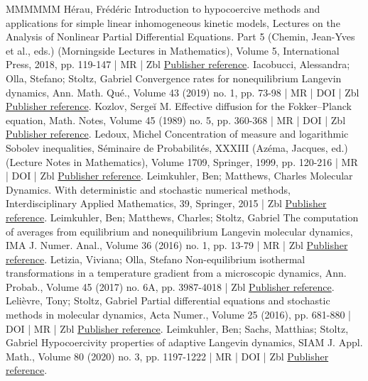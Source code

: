 \begin{thebibliography}{MMMMMM}
 Hérau, Frédéric Introduction to hypocoercive methods and applications for simple linear inhomogeneous kinetic models, Lectures on the Analysis of Nonlinear Partial Differential Equations. Part 5 (Chemin, Jean-Yves et al., eds.) (Morningside Lectures in Mathematics), Volume 5, International Press, 2018, pp. 119-147 | MR | Zbl \href{https://ahl.centre-mersenne.org/item/AHL_2022__5__523_0/#Herau16}{Publisher reference}.
 Iacobucci, Alessandra; Olla, Stefano; Stoltz, Gabriel Convergence rates for nonequilibrium Langevin dynamics, Ann. Math. Qué., Volume 43 (2019) no. 1, pp. 73-98 | MR | DOI | Zbl \href{https://ahl.centre-mersenne.org/item/AHL_2022__5__523_0/#IOS19}{Publisher reference}.
 Kozlov, Sergeĭ M. Effective diffusion for the Fokker–Planck equation, Math. Notes, Volume 45 (1989) no. 5, pp. 360-368 | MR | DOI | Zbl \href{https://ahl.centre-mersenne.org/item/AHL_2022__5__523_0/#Kozlov89}{Publisher reference}.
 Ledoux, Michel Concentration of measure and logarithmic Sobolev inequalities, Séminaire de Probabilités, XXXIII (Azéma, Jacques, ed.) (Lecture Notes in Mathematics), Volume 1709, Springer, 1999, pp. 120-216 | MR | DOI | Zbl \href{https://ahl.centre-mersenne.org/item/AHL_2022__5__523_0/#Led99}{Publisher reference}.
 Leimkuhler, Ben; Matthews, Charles Molecular Dynamics. With deterministic and stochastic numerical methods, Interdisciplinary Applied Mathematics, 39, Springer, 2015 | Zbl \href{https://ahl.centre-mersenne.org/item/AHL_2022__5__523_0/#LM15}{Publisher reference}.
 Leimkuhler, Ben; Matthews, Charles; Stoltz, Gabriel The computation of averages from equilibrium and nonequilibrium Langevin molecular dynamics, IMA J. Numer. Anal., Volume 36 (2016) no. 1, pp. 13-79 | MR | Zbl \href{https://ahl.centre-mersenne.org/item/AHL_2022__5__523_0/#LMS16}{Publisher reference}.
 Letizia, Viviana; Olla, Stefano Non-equilibrium isothermal transformations in a temperature gradient from a microscopic dynamics, Ann. Probab., Volume 45 (2017) no. 6A, pp. 3987-4018 | Zbl \href{https://ahl.centre-mersenne.org/item/AHL_2022__5__523_0/#OL15}{Publisher reference}.
 Lelièvre, Tony; Stoltz, Gabriel Partial differential equations and stochastic methods in molecular dynamics, Acta Numer., Volume 25 (2016), pp. 681-880 | DOI | MR | Zbl \href{https://ahl.centre-mersenne.org/item/AHL_2022__5__523_0/#LS16}{Publisher reference}.
 Leimkuhler, Ben; Sachs, Matthias; Stoltz, Gabriel Hypocoercivity properties of adaptive Langevin dynamics, SIAM J. Appl. Math., Volume 80 (2020) no. 3, pp. 1197-1222 | MR | DOI | Zbl \href{https://ahl.centre-mersenne.org/item/AHL_2022__5__523_0/#LSS19}{Publisher reference}.

\end{thebibliography}
